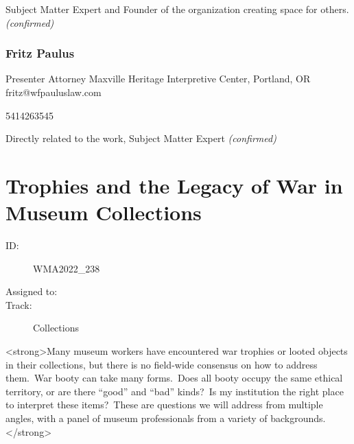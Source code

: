 \documentclass{report}
\begin{document}
                Subject Matter Expert and Founder of the organization creating space for others.
                \emph{ (confirmed) }
              

              
                \subsubsection*{ Fritz Paulus }
                Presenter\newline
                 Attorney\newline
                Maxville Heritage Interpretive Center, Portland, OR
                \newline
                fritz@wfpauluslaw.com\newline
                
                5414263545\newline

                Directly related to the work, Subject Matter Expert
                \emph{ (confirmed) }
              

              

              
        
          \newpage
          \section{ Trophies and the Legacy of War in Museum Collections }
            \begin{description}
              \item [ID:]
              WMA2022\_238

              \item [Assigned to:]
                \item [Track:]Collections~
              \end{description}

              <strong>Many museum workers have encountered war trophies or looted objects in their collections, but there is no field-wide consensus on how to address them. War booty can take many forms. Does all booty occupy the same ethical territory, or are there “good” and “bad” kinds? Is my institution the right place to interpret these items? These are questions we will address from multiple angles, with a panel of museum professionals from a variety of backgrounds.</strong>
\end{document}
